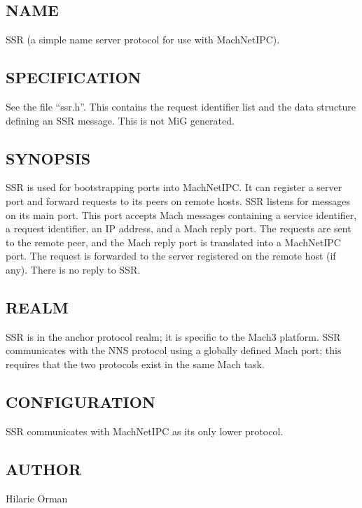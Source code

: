 %
%
%

\subsection*{NAME}

\noindent SSR (a simple name server protocol for use with MachNetIPC).

\subsection*{SPECIFICATION}

See the file ``ssr.h''.  This contains the request identifier list
and the data structure defining an SSR message.  This is not MiG generated.

\subsection*{SYNOPSIS}

\noindent SSR is used for bootstrapping ports into MachNetIPC.
It can register a server port and forward requests to its peers 
on remote hosts. SSR listens for messages on its main port.
This port accepts Mach messages containing a service identifier, a request
identifier, an IP address, and a Mach reply port.  The requests are sent 
to the remote peer, and the Mach reply port is translated into a MachNetIPC
port.  The request is forwarded to the server registered on the remote
host (if any).  There is no reply to SSR.  

\subsection*{REALM}

SSR is in the anchor protocol realm; it is specific to the Mach3 platform.
SSR communicates with the NNS protocol using a globally defined Mach port; 
this requires that the two protocols exist in the same Mach task.

\subsection*{CONFIGURATION}

SSR communicates with MachNetIPC as its only lower protocol.


\subsection*{AUTHOR}

\noindent Hilarie Orman

